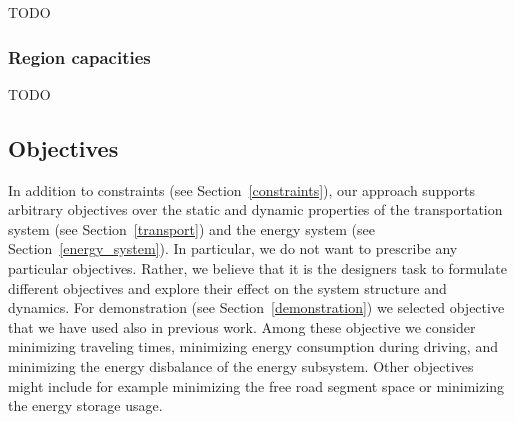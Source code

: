 TODO


\subsubsection{Region capacities}
\label{capacities}

TODO

\subsection{Objectives}
\label{objectives}

In addition to constraints (see Section~\ref{constraints}), our approach supports arbitrary objectives over the static and dynamic properties of the transportation system (see Section~\ref{transport}) and the energy system (see Section~\ref{energy_system}). In particular, we do not want to prescribe any particular objectives. Rather, we believe that it is the designers task to formulate different objectives and explore their effect on the system structure and dynamics. For demonstration (see Section~\ref{demonstration}) we selected objective that we have used also in previous work. Among these objective we consider minimizing traveling times, minimizing energy consumption during driving, and minimizing the energy disbalance of the energy subsystem. Other objectives might include for example minimizing the free road segment space or minimizing the energy storage usage.
